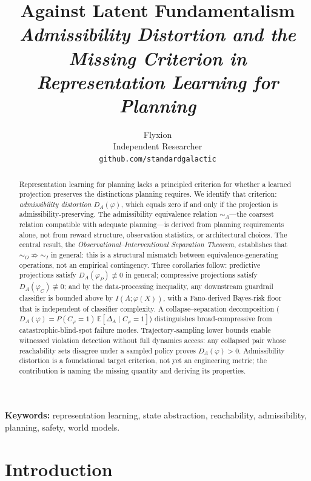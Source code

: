 \documentclass[10pt,twocolumn]{article}
\title{\textbf{Against Latent Fundamentalism}\\[2pt]
  {\normalsize\itshape Admissibility Distortion and the Missing Criterion
  in Representation Learning for Planning}}
\author{Flyxion\\
  {\small Independent Researcher}\\
  {\small \texttt{github.com/standardgalactic}}}
\date{}
\theoremstyle{plain}
\theoremstyle{definition}
\theoremstyle{remark}
\newcommand{\simA}{\sim_{\!A}}
\newcommand{\simO}{\sim_{\!O}}
\newcommand{\simI}{\sim_{\!I}}
\newcommand{\DA}{D_{A}(\varphi)}
\begin{document}
\maketitle
\thispagestyle{plain}

\begin{abstract}
\noindent
Representation learning for planning lacks a principled criterion for whether a
learned projection preserves the distinctions planning requires. We identify that
criterion: \emph{admissibility distortion} $\DA$, which equals zero if and only
if the projection is admissibility-preserving. The admissibility equivalence
relation $\simA$---the coarsest relation compatible with adequate planning---is
derived from planning requirements alone, not from reward structure, observation
statistics, or architectural choices. The central result, the
\emph{Observational--Interventional Separation Theorem}, establishes that
$\simO \not\Rightarrow \simI$ in general: this is a structural mismatch between
equivalence-generating operations, not an empirical contingency. Three corollaries
follow: predictive projections satisfy $D_{A}(\varphi_{P})\not\equiv 0$ in
general; compressive projections satisfy $D_{A}(\varphi_{C})\not\equiv 0$; and
by the data-processing inequality, any downstream guardrail classifier is bounded
above by $I(A;\varphi(X))$, with a Fano-derived Bayes-risk floor that is
independent of classifier complexity. A collapse--separation decomposition
($\DA = P(C_{\varphi}{=}1)\,\mathbb{E}[\Delta_{A}\mid C_{\varphi}{=}1]$)
distinguishes broad-compressive from catastrophic-blind-spot failure modes.
Trajectory-sampling lower bounds enable witnessed violation detection without full
dynamics access: any collapsed pair whose reachability sets disagree under a
sampled policy proves $\DA>0$. Admissibility distortion is
a foundational target criterion, not yet an engineering metric; the contribution
is naming the missing quantity and deriving its properties.
\end{abstract}

\smallskip
\noindent\textbf{Keywords:} representation learning, state abstraction, reachability,
admissibility, planning, safety, world models.

\section{Introduction}
\label{sec:intro}
\end{document}
